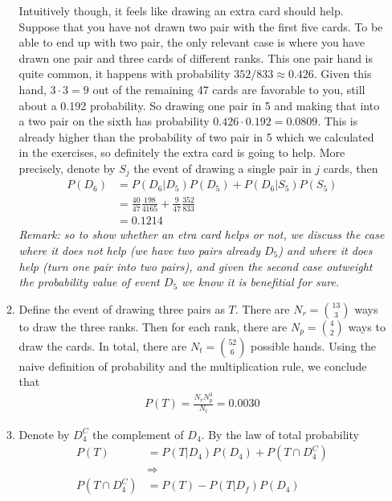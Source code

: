 \begin{exercise}
\begin{solution}
\begin{enumerate}
\begin{enumerate}
				Intuitively  though, it feels like drawing an extra card should help. Suppose that you have not drawn two pair with the first five cards. To be able to end up with two pair, the only relevant case is where you have drawn one pair and three cards of different ranks. This one pair hand is quite common, it happens with probability $352/833\approx 0.426$. Given this hand, $3\cdot 3=9$ out of the remaining 47 cards are favorable to you, still about a 0.192 probability. So drawing one pair in 5 and making that into a two pair on the sixth has probability $0.426\cdot 0.192=0.0809$. This is already higher than the probability of two pair in 5 which we calculated in the exercises, so definitely the extra card is going to help. More precisely, denote by $S_j$ the event of drawing a single pair in $j$ cards, then
				\begin{align*}
					P(D_6) &= P(D_6|D_5) P(D_5) + P(D_6|S_5)P(S_5)\\
					&=\frac{40}{47}\frac{198}{4165} + \frac{9}{47}\frac{352}{833}\\
					& = 0.1214
				\end{align*}
				\textit{Remark: so to show whether an etra card helps or not, we discuss the case where it does not help (we have two pairs already $D_5$) and where it does help (turn one pair into two pairs), and given the second case outweight the probability value of event $D_5$ we know it is benefitial for sure.}
				\item Define the event of drawing three pairs as $T$. There are $N_{r} = {13 \choose 3}$ ways to draw the three ranks. Then for each rank, there are $N_{p} = {4 \choose 2}$ ways to draw the cards. In total, there are $N_{t} = {52 \choose 6}$ possible hands. Using the naive definition of probability and the multiplication rule, we conclude that
				\begin{align*}
					P(T) = \frac{N_{r}N_{p}^3}{N_{t}} = 0.0030
				\end{align*}
			\item Denote by $D_{4}^{C}$ the complement of $D_{4}$. By the law of total probability
			\begin{align*}
				P(T) &= P(T|D_{4})P(D_{4}) + P(T\cap D_{4}^{C})\\
				&\Rightarrow \\
				P(T\cap D_{4}^{C})&=P(T)-P(T|D_{f})P(D_{4})
			\end{align*}

\end{enumerate}
\end{enumerate}
\end{solution}
\end{exercise}
